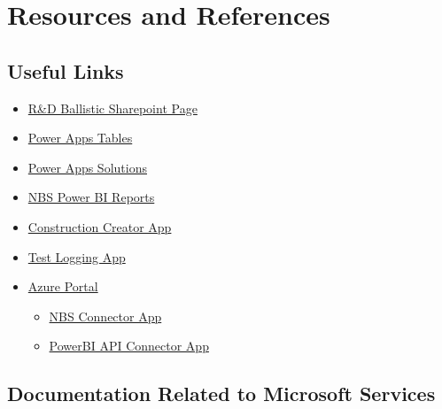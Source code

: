\section{Resources and References}

\subsection{Useful Links}

\begin{itemize}
    \item \href{https://nfmgroup.sharepoint.com/sites/RDB}{R\&D Ballistic Sharepoint Page}
    \item \href{https://make.powerapps.com/environments/Default-6013a954-a3ca-49c2-b3e2-288264752369/entities}{Power Apps Tables}
    \item \href{https://make.powerapps.com/environments/Default-6013a954-a3ca-49c2-b3e2-288264752369/solutions}{Power Apps Solutions}
    \item \href{https://app.powerbi.com/groups/acc871ab-9fcc-4ad0-ae62-d5a01f6be861/lineage?ctid=6013a954-a3ca-49c2-b3e2-288264752369&experience=power-bi}{NBS Power BI Reports}
    \item \href{https://orga9b1f99a.crm4.dynamics.com/main.aspx?appid=05ee93e5-63be-e911-a95f-000d3ab5e874&pagetype=entitylist&etn=craab_nbsgrouporder&viewid=2e17b148-b9c6-4803-9c9e-780fa5c0f116&viewType=1039}{Construction Creator App}
    \item \href{https://apps.powerapps.com/play/e/default-6013a954-a3ca-49c2-b3e2-288264752369/a/e1db19c6-4475-4b66-be3b-fcec7d220129?tenantId=6013a954-a3ca-49c2-b3e2-288264752369}{Test Logging App}
    \item \href{https://portal.azure.com/#home}{Azure Portal}
    \begin{itemize}
        \item \href{https://portal.azure.com/#view/Microsoft_AAD_RegisteredApps/ApplicationMenuBlade/~/Overview/appId/ab308522-50f0-46fd-a86a-e0fe16215ed8/isMSAApp~/false}{NBS Connector App}
        \item \href{https://portal.azure.com/#view/Microsoft_AAD_RegisteredApps/ApplicationMenuBlade/~/Overview/appId/251ebc4f-926e-4ed3-a6d9-2219ba259df4/isMSAApp~/false}{PowerBI API Connector App}
    \end{itemize}
\end{itemize}

\subsection{Documentation Related to Microsoft Services}

